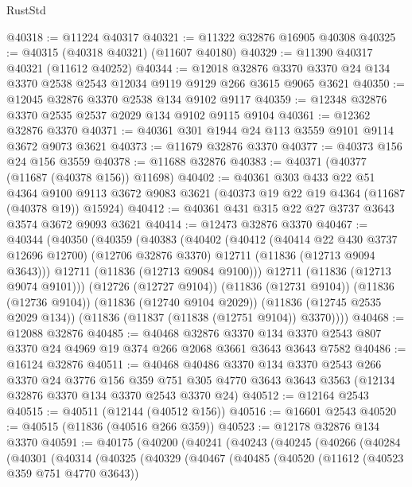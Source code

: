 \begin{lexlean}{RustStd}
\begin{coremodule}
@40318 := @11224 @40317
@40321 := @11322 @32876 @16905 @40308
@40325 := @40315 (@40318 @40321) (@11607 @40180)
@40329 := @11390 @40317 @40321 (@11612 @40252)
@40344 := @12018
    @32876
    @3370
    @3370
    @24
    @134
    @3370
    @2538
    @2543
    @12034
    @9119
    @9129
    @266
    @3615
    @9065
    @3621
@40350 := @12045 @32876 @3370 @2538 @134 @9102 @9117
@40359 := @12348 @32876 @3370 @2535 @2537 @2029 @134 @9102 @9115 @9104
@40361 := @12362 @32876 @3370
@40371 := @40361 @301 @1944 @24 @113 @3559 @9101 @9114 @3672 @9073 @3621
@40373 := @11679 @32876 @3370
@40377 := @40373 @156 @24 @156 @3559
@40378 := @11688 @32876
@40383 := @40371 (@40377 (@11687 (@40378 @156)) @11698)
@40402 := @40361
    @303
    @433
    @22
    @51
    @4364
    @9100
    @9113
    @3672
    @9083
    @3621
    (@40373 @19 @22 @19 @4364 (@11687 (@40378 @19)) @15924)
@40412 := @40361 @431 @315 @22 @27 @3737 @3643 @3574 @3672 @9093 @3621
@40414 := @12473 @32876 @3370
@40467 := @40344
    (@40350
      (@40359
        (@40383
          (@40402
            (@40412
              (@40414 @22 @430 @3737 @12696 @12700)
              (@12706 @32876 @3370)
              @12711
              (@11836 (@12713 @9094 @3643)))
            @12711
            (@11836 (@12713 @9084 @9100)))
          @12711
          (@11836 (@12713 @9074 @9101)))
        (@12726 (@12727 @9104))
        (@11836 (@12731 @9104))
        (@11836 (@12736 @9104))
        (@11836 (@12740 @9104 @2029))
        (@11836 (@12745 @2535 @2029 @134))
        (@11836 (@11837 (@11838 (@12751 @9104)) @3370))))
@40468 := @12088 @32876
@40485 := @40468
    @32876
    @3370
    @134
    @3370
    @2543
    @807
    @3370
    @24
    @4969
    @19
    @374
    @266
    @2068
    @3661
    @3643
    @3643
    @7582
@40486 := @16124 @32876
@40511 := @40468
    @40486
    @3370
    @134
    @3370
    @2543
    @266
    @3370
    @24
    @3776
    @156
    @359
    @751
    @305
    @4770
    @3643
    @3643
    @3563
    (@12134 @32876 @3370 @134 @3370 @2543 @3370 @24)
@40512 := @12164 @2543
@40515 := @40511 (@12144 (@40512 @156))
@40516 := @16601 @2543
@40520 := @40515 (@11836 (@40516 @266 @359))
@40523 := @12178 @32876 @134 @3370
@40591 := @40175
    (@40200
      (@40241
        (@40243
          (@40245
            (@40266
              (@40284
                (@40301
                  (@40314
                    (@40325
                      (@40329
                        (@40467
                          (@40485
                            (@40520
                              (@11612 (@40523 @359 @751 @4770 @3643))

\end{coremodule}
\end{lexlean}
